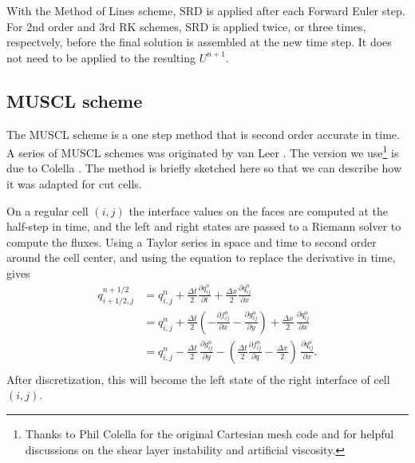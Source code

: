 With the Method of Lines scheme, SRD is applied after each Forward Euler
step. For 2nd order and 3rd RK schemes, SRD is applied twice, or three
times, respectvely, before the final solution is assembled at the new time
step. It does not need to be applied to the resulting $U^{n+1}$.

\subsection{MUSCL scheme}
The MUSCL scheme is a one step method that is second order accurate in
time. A series of MUSCL schemes  was originated by van Leer 
\cite{vanleer:muscl}. The version we use\footnote{Thanks to Phil 
Colella for the original Cartesian mesh code and for helpful discussions on the shear
layer instability and artificial viscosity.}
is due to Colella \cite{Colella:Unsplit}.
The method is briefly sketched here so that we can describe how it was
adapted for cut cells. 

On a regular cell $(i,j)$ the interface values on the 
faces are computed at the half-step in time, and the left and right states
are passed to a Riemann
solver to compute the fluxes.
Using a Taylor series in space and time to second order around the
cell center, and using the equation to replace the derivative in time,  gives
\begin{equation}\label{taylor}
\begin{split}
q_{i+1/2,j}^{n+1/2} & = q_{i,j}^n + 
              \frac{\Delta t}{2} \frac{\partial q_{ij}^n}{\partial t} + 
              \frac{\Delta x}{2} \frac{\partial q_{ij}^n}{\partial x} \\[.08in]
            &  = q_{i,j}^n + \frac{\Delta t}{2} 
            (-\frac{\partial f_{ij}^n}{\partial x} -
             \frac{\partial g_{ij}^n}{\partial y})  +
             \frac{\Delta x}{2} \, \frac{\partial q_{ij}^n}{\partial x} \\[.08in]
            &  = q_{i,j}^n - \frac{\Delta t}{2} \, 
             \frac{\partial g_{ij}^n}{\partial y}  -
            ( \frac{\Delta t}{2} 
            \frac{\partial f_{ij}^n}{\partial q} -
             \frac{\Delta x}{2} ) \,\frac{\partial q_{ij}^n}{\partial x} . \\[.08in]
\end{split}
\end{equation}
After discretization, this will become the left state of the right interface
of cell $(i,j)$.


